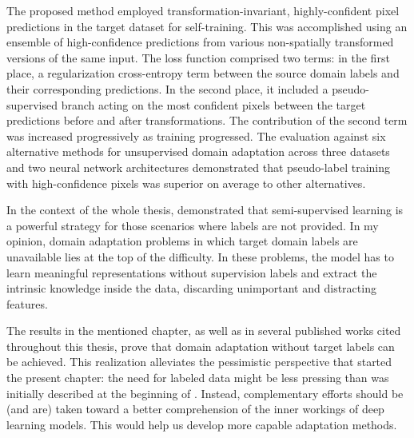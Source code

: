 The proposed method employed transformation-invariant, highly-confident pixel predictions in the target dataset for self-training. This was accomplished using an ensemble of high-confidence predictions from various non-spatially transformed versions of the same input. The loss function comprised two terms: in the first place, a regularization cross-entropy term between the source domain labels and their corresponding predictions. In the second place, it included a pseudo-supervised branch acting on the most confident pixels between the target predictions before and after transformations. The contribution of the second term was increased progressively as training progressed. The evaluation against six alternative methods for unsupervised domain adaptation across three datasets and two neural network architectures demonstrated that pseudo-label training with high-confidence pixels was superior on average to other alternatives.  

In the context of the whole thesis,  demonstrated that semi-supervised learning is a powerful strategy for those scenarios where labels are not provided. In my opinion, domain adaptation problems in which target domain labels are unavailable lies at the top of the difficulty. In these problems, the model has to learn meaningful representations without supervision labels and extract the intrinsic knowledge inside the data, discarding unimportant and distracting features.

The results in the mentioned chapter, as well as in several published works cited throughout this thesis, prove that domain adaptation without target labels can be achieved. This realization alleviates the pessimistic perspective that started the present chapter: the need for labeled data might be less pressing than was initially described at the beginning of . Instead, complementary efforts should be (and are) taken toward a better comprehension of the inner workings of deep learning models. This would help us develop more capable adaptation methods.